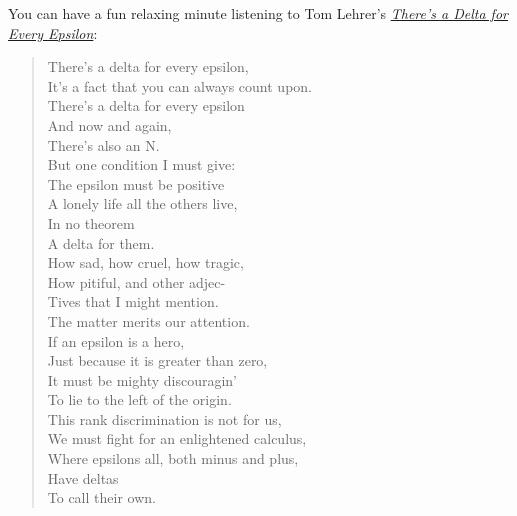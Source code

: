 \documentclass{article}
\theoremstyle{definition}
\begin{document}
You can have a fun relaxing minute listening to Tom Lehrer's \href{https://www.youtube.com/watch?v=zxFCQplZgKI#t=2m35s}{\textit{There's a Delta for Every Epsilon}}:
\begin{quote}
There's a delta for every epsilon, \\
It's a fact that you can always count upon. \\
There's a delta for every epsilon \\
And now and again, \\
There's also an N. \\

But one condition I must give: \\
The epsilon must be positive \\
A lonely life all the others live, \\
In no theorem \\
A delta for them. \\

How sad, how cruel, how tragic, \\
How pitiful, and other adjec- \\
Tives that I might mention. \\
The matter merits our attention. \\
If an epsilon is a hero, \\
Just because it is greater than zero, \\
It must be mighty discouragin' \\
To lie to the left of the origin. \\

This rank discrimination is not for us, \\
We must fight for an enlightened calculus, \\
Where epsilons all, both minus and plus, \\
Have deltas \\
To call their own.
\end{quote}

\newpage
\printindex
\end{document}
